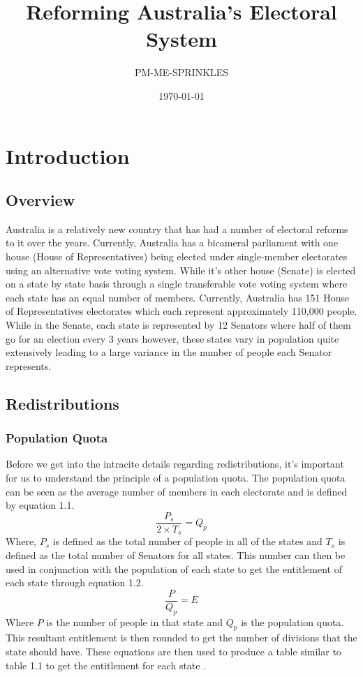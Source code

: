 \documentclass{report}
\begin{document}
  \title{Reforming Australia's Electoral System}
  \date{\today}
  \author{PM-ME-SPRINKLES}
  \maketitle

  \tableofcontents

  \chapter{Introduction}
  \section{Overview}
  Australia is a relatively new country that has had a number of electoral reforms to it over the years. Currently, Australia has a bicameral parliament with one house (House of Representatives) being elected under single-member electorates using an alternative vote voting system. While it's other house (Senate) is elected on a state by state basis through a single transferable vote voting system where each state has an equal number of members. Currently, Australia has 151 House of Representatives electorates which each represent approximately 110,000 people. While in the Senate, each state is represented by 12 Senators where half of them go for an election every 3 years however, these states vary in population quite extensively leading to a large variance in the number of people each Senator represents.

  \section{Redistributions}
  \subsection{Population Quota}
  Before we get into the intracite details regarding redistributions, it's important for us to understand the principle of a population quota. The population quota can be seen as the average number of members in each electorate and is defined by equation 1.1.
  \begin{equation}
    \frac{P_s}{2\times T_s}=Q_p
  \end{equation}
  Where, $P_s$ is defined as the total number of people in all of the states and $T_s$ is defined as the total number of Senators for all states. This number can then be used in conjunction with the population of each state to get the entitlement of each state through equation 1.2.
  \begin{equation}
    \frac{P}{Q_p} = E
  \end{equation}
  Where $P$ is the number of people in that state and $Q_p$ is the population quota. This resultant entitlement is then rounded to get the number of divisions that the state should have. These equations are then used to produce a table similar to table 1.1 to get the entitlement for each state \cite{aec:2017redis}.
\end{document}
